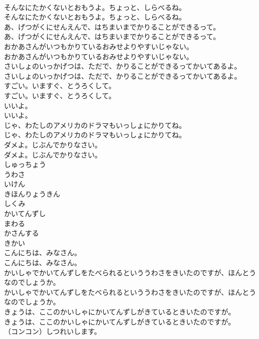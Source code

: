 \documentclass[8pt]{extreport}
\begin{document}
\begin{CJK}{UTF8}{min}
\\	そんなにたかくないとおもうよ。ちょっと、しらべるね。	
\\	そんなにたかくないとおもうよ。ちょっと、しらべるね。 
\\	あ、げつがくにせんえんで、はちまいまでかりることができるって。	
\\	あ、げつがくにせんえんで、はちまいまでかりることができるって。 
\\	おかあさんがいつもかりているおみせよりやすいじゃない。	
\\	おかあさんがいつもかりているおみせよりやすいじゃない。 
\\	さいしょのいっかげつは、ただで、かりることができるってかいてあるよ。	
\\	さいしょのいっかげつは、ただで、かりることができるってかいてあるよ。 
\\	すごい。いますぐ、とうろくして。	
\\	すごい。いますぐ、とうろくして。 
\\	いいよ。	
\\	いいよ。 
\\	じゃ、わたしのアメリカのドラマもいっしょにかりてね。	
\\	じゃ、わたしのアメリカのドラマもいっしょにかりてね。 
\\	ダメよ。じぶんでかりなさい。	
\\	ダメよ。じぶんでかりなさい。 
\\	しゅっちょう
\\	うわさ
\\	いけん
\\	きほんりょうきん
\\	しくみ
\\	かいてんずし
\\	まわる
\\	かさんする
\\	きかい
\\	こんにちは、みなさん。	
\\	こんにちは、みなさん。 
\\	かいしゃでかいてんずしをたべられるといううわさをきいたのですが、ほんとうなのでしょうか。	
\\	かいしゃでかいてんずしをたべられるといううわさをきいたのですが、ほんとうなのでしょうか。 
\\	きょうは、ここのかいしゃにかいてんずしがきているときいたのですが。	
\\	きょうは、ここのかいしゃにかいてんずしがきているときいたのですが。 
\\	（コンコン）しつれいします。	

\end{CJK}
\end{document}
